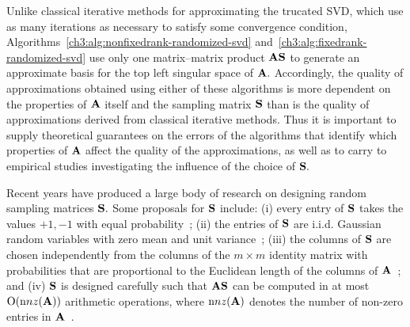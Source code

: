 Unlike classical iterative methods for approximating the trucated SVD, which 
use as many iterations as necessary to satisfy some convergence condition, 
Algorithms~\ref{ch3:alg:nonfixedrank-randomized-svd} and~\ref{ch3:alg:fixedrank-randomized-svd}
use only one matrix--matrix product $\mathbf{A} \mathbf{S}$ to generate an approximate
basis for the top left singular space of $\mathbf{A}.$ Accordingly, the quality of
approximations obtained using either of these algorithms is more dependent
on the properties of $\mathbf{A}$ itself and the sampling matrix $\mathbf{S}$ than is
the quality of approximations derived from classical iterative methods.
Thus it is important to supply theoretical guarantees on the errors of the algorithms
that identify which properties of $\mathbf{A}$ affect the quality of the approximations,
as well as to carry to empirical studies investigating the influence of the 
choice of $\mathbf{S}.$ 

Recent years have produced a large body of research on designing random
sampling matrices $\mathbf{S}.$ Some proposals for $\mathbf{S}$ include: 
(i) every entry of $\mathbf{S}$ takes the values $+1,-1$ with equal 
probability~\cite{CW09,Zou10}; (ii) the entries of $\mathbf{S}$ are
i.i.d. Gaussian random variables with zero mean and unit variance~\cite{HMT11};
(iii) the columns of $\mathbf{S}$ are chosen independently from the columns of
the $m \times m$ identity matrix with probabilities that are proportional to 
the Euclidean length of the columns of $\mathbf{A}$~\cite{FKV98,DKM06b}; and
(iv) $\mathbf{S}$ is designed carefully such that $\mathbf{A} \mathbf{S}$ can be
computed in at most $\mathrm{O}({ \mathrm nnz }(\mathbf{A})) $ arithmetic operations,
where ${ \mathrm nnz }(\mathbf{A})$ denotes the number of non-zero entries in
$\mathbf{A}$~\cite{CW12}.






